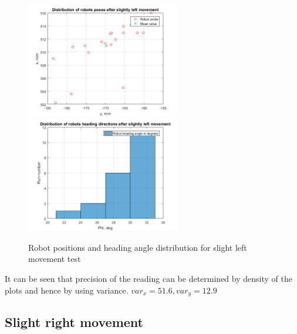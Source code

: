 \documentclass[a4paper, 12pt]{article}
\begin{document}
\begin{figure}[h]
  \centering
  \caption{Robot positions and heading angle distribution for slight left movement test\label{fig:l}}
  \includegraphics[width=0.6\textwidth]{l}
  \includegraphics[width=0.6\textwidth]{lphi}
\end{figure}

It can be seen that precision of the reading can be determined by density of the plots and hence by using variance. $var_x = 51.6,var_y = 12.9$
\newpage
\subsection{Slight right movement}
\end{document}
